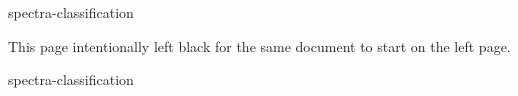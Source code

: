 \documentclass[symmetric, a4paper]{tufte-book}
\begin{document}
\newcommand\testfolder{chapters/spec-030-classification/}
\newcommand\testname{spectra-classification}

{\testname}

\cleardoublepage
This page intentionally left black for the same document to start on the left page.

{\testname}
\end{document}
